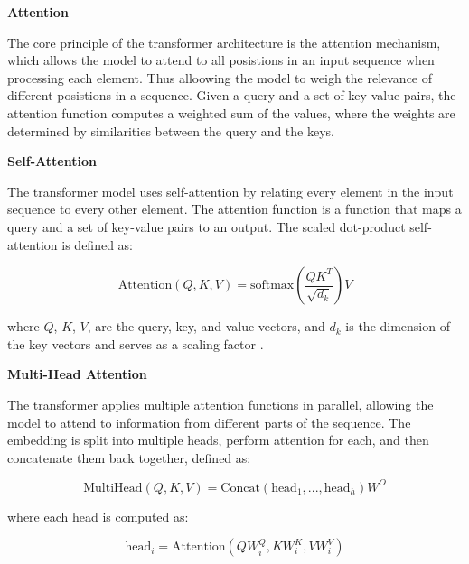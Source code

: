 \documentclass[lettersize,journal]{IEEEtran}
\renewcommand{\paragraph}[1]{%
  \vspace{1.5ex}\textbf{#1}\quad
}
\begin{document}
\paragraph{Attention}
The core principle of the transformer architecture is the attention mechanism, which allows the model to attend to all posistions in an input sequence when processing each element. Thus alloowing the model to weigh the relevance of different posistions in a sequence. Given a query and a set of key-value pairs, the attention function computes a weighted sum of the values, where the weights are determined by similarities between the query and the keys.

\paragraph{Self-Attention}
The transformer model uses self-attention by relating every element in the input sequence to every other element. The attention function is a function that maps a query and a set of key-value pairs to an output. The scaled dot-product self-attention is defined as:

\begin{equation}
    \text{Attention}(Q,K,V) = \text{softmax}\left(\frac{QK^T}{\sqrt{d_k}}\right)V
\end{equation}

\noindent where $Q$, $K$, $V$, are the query, key, and value vectors, and $d_k$ is the dimension of the key vectors and serves as a scaling factor \cite{vaswani2023attentionneed}. 

\paragraph{Multi-Head Attention}
The transformer applies multiple attention functions in parallel, allowing the model to attend to information from different parts of the sequence. The embedding is split into multiple heads, perform attention for each, and then concatenate them back together, defined as:

\begin{equation}
    \label{eq:multihead}
    \text{MultiHead}(Q,K,V) = \text{Concat}(\text{head}_1, ..., \text{head}_h)W^O
\end{equation}
    
\noindent where each head is computed as:

\begin{equation}
    \text{head}_i = \text{Attention}(QW^Q_i, KW^K_i, VW^V_i)
\end{equation}
\end{document}
